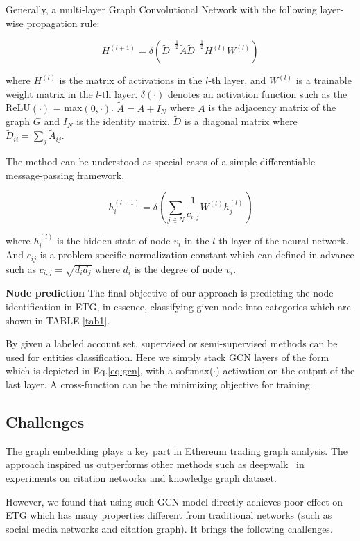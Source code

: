  Generally, a multi-layer Graph Convolutional Network with the following layer-wise propagation rule:

\begin{equation}
H^{(l+1)}=\delta(\tilde{D}^{-\frac{1}{2}}\tilde{A}\tilde{D}^{-\frac{1}{2}}H^{(l)}W^{(l)})
\label{eq1}
\end{equation}

where $H^{(l)}$ is the matrix of activations in the $l$-th layer, and $W^{(l)}$ is a trainable weight matrix in the $l$-th layer. $\delta(\cdot)$ denotes an activation function such as the ReLU$(\cdot)$ = max$(0,\cdot)$. $\tilde{A}=A+I_N$ where $A$ is the adjacency matrix of the graph $G$ and $I_N$ is the identity matrix. $\tilde{D}$ is a diagonal matrix where $\tilde{D}_{ii}=\sum_{j}\tilde{A}_{ij}$.

The method can be understood as special cases of a simple differentiable message-passing framework.

\begin{equation}
h_i^{(l+1)}=\delta(\sum_{j \in N} \frac{1}{c_{i,j}}W^{(l)}h_j^{(l)})
\label{eq:gcn}
\end{equation}

where $h_i^{(l)}$ is the hidden state of node $v_i$ in the $l$-th layer of the neural network. And $c_{ij}$ is a problem-specific normalization constant which can defined in advance such as $c_{i,j}=\sqrt{d_i d_j}$ where $d_i$ is the degree of node $v_i$.

\textbf{Node prediction}
The final objective of our approach is predicting the node identification in ETG, in essence, classifying given node into categories which are shown in TABLE \ref{tab1}.

By given a labeled account set, supervised or semi-supervised methods can be used for entities classification. Here we simply stack GCN layers of the form which is depicted in Eq.\ref{eq:gcn}, with a softmax($\cdot$) activation on the output of the last layer. A cross-function can be the minimizing objective for training. 

\subsection{Challenges}
The graph embedding plays a key part in Ethereum trading graph analysis. The approach \cite{kipf2016semi} inspired us outperforms other methods such as deepwalk~\cite{perozzi2014deepwalk} in experiments on citation networks and knowledge graph dataset. 

However, we found that using such GCN model directly achieves poor effect on ETG which has many properties different from traditional networks (such as social media networks and citation graph). It brings the following challenges.



